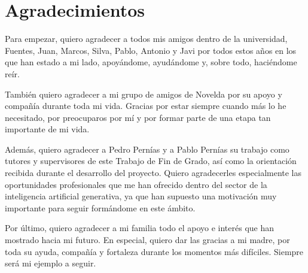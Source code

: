 \documentclass[a4paper,11pt,titlepage]{scrbook}
\makeatletter
\let\cleardoublepage\clearpage
\def\clearpage{%
  \ifvmode
    \ifnum \@dbltopnum =\m@ne
      \ifdim \pagetotal <\topskip
        \hbox{}
      \fi
    \fi
  \fi
  \newpage
  \thispagestyle{empty}
  \write\m@ne{}
  \vbox{}
  \penalty -\@Mi
}
\makeatother
\begin{document}
\cleardoublepage %
\chapter*{Agradecimientos} 

\thispagestyle{empty} Para empezar, quiero agradecer a todos mis amigos dentro de la universidad, Fuentes, Juan, Marcos, Silva, Pablo, Antonio y Javi  por todos estos años en los que han estado a mi lado, apoyándome, ayudándome y, sobre todo, haciéndome reír. 

\medskip También quiero agradecer a mi grupo de amigos de Novelda por su apoyo y compañía durante toda mi vida. Gracias por estar siempre cuando más lo he necesitado, por preocuparos por mí y por formar parte de una etapa tan importante de mi vida. 

\medskip Además, quiero agradecer a Pedro Pernías y a Pablo Pernías su trabajo como tutores y supervisores de este Trabajo de Fin de Grado, así como la orientación recibida durante el desarrollo del proyecto. Quiero agradecerles especialmente las oportunidades profesionales que me han ofrecido dentro del sector de la inteligencia artificial generativa, ya que han supuesto una motivación muy importante para seguir formándome en este ámbito. 

\medskip Por último, quiero agradecer a mi familia todo el apoyo e interés que han mostrado hacia mi futuro. En especial, quiero dar las gracias a mi madre, por toda su ayuda, compañía y fortaleza durante los momentos más difíciles. Siempre será mi ejemplo a seguir.


\cleardoublepage %


% 
\end{document}
